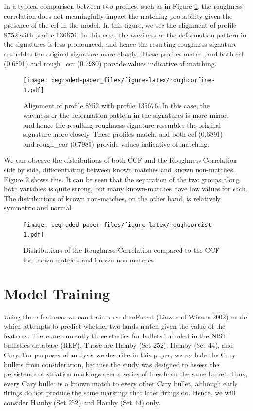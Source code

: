 \documentclass[12pt,]{article}
\theoremstyle{definition}
\theoremstyle{definition}
\theoremstyle{definition}
\theoremstyle{remark}
\begin{document}
In a typical comparison between two profiles, such as in Figure
\ref{fig:roughcorfine}, the roughness correlation does not meaningfully
impact the matching probability given the presence of the ccf in the
model. In this figure, we see the alignment of profile 8752 with profile
136676. In this case, the waviness or the deformation pattern in the
signatures is less pronounced, and hence the resulting roughness
signature resembles the original signature more closely. These profiles
match, and both ccf (0.6891) and rough\_cor (0.7980) provide values
indicative of matching.

\begin{figure}[htbp]
\centering
\texttt{[image: degraded-paper\_files/figure-latex/roughcorfine-1.pdf]}
\caption{\label{fig:roughcorfine}Alignment of profile 8752 with profile
136676. In this case, the waviness or the deformation pattern in the
signatures is more minor, and hence the resulting roughness signature
resembles the original signature more closely. These profiles match, and
both ccf (0.6891) and rough\_cor (0.7980) provide values indicative of
matching.}
\end{figure}

We can observe the distributions of both CCF and the Roughness
Correlation side by side, differentiating between known matches and
known non-matches. Figure \ref{fig:roughcordist} shows this. It can be
seen that the separation of the two groups along both variables is quite
strong, but many known-matches have low values for each. The
distributions of known non-matches, on the other hand, is relatively
symmetric and normal.

\begin{figure}[htbp]
\centering
\texttt{[image: degraded-paper\_files/figure-latex/roughcordist-1.pdf]}
\caption{\label{fig:roughcordist}Distributions of the Roughness Correlation
compared to the CCF for known matches and known non-matches}
\end{figure}

\section{Model Training}\label{model-training}

Using these features, we can train a randomForest (Liaw and Wiener 2002)
model which attempts to predict whether two lands match given the value
of the features. There are currently three studies for bullets included
in the NIST ballistics database (REF). Those are Hamby (Set 252), Hamby
(Set 44), and Cary. For purposes of analysis we describe in this paper,
we exclude the Cary bullets from consideration, because the study was
designed to assess the persistence of striation markings over a series
of fires from the same barrel. Thus, every Cary bullet is a known match
to every other Cary bullet, although early firings do not produce the
same markings that later firings do. Hence, we will consider Hamby (Set
252) and Hamby (Set 44) only.
\end{document}
